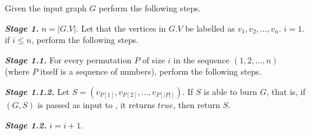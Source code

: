 \begin{algorithm}\label{algorithm:burn-general-optimal}
Given the input graph $G$ perform the following steps.
\end{algorithm}

\textbf{\textit{Stage 1.}} $n = |G.V|$. Let that the vertices in $G.V$ be labelled as $v_1,v_2,\dots,v_n$. $i=1$. if $i\leq n$, perform the following steps.

\textbf{\textit{Stage 1.1.}} For every permutation $P$ of size $i$ in the sequence $(1,2,\dots,n)$ (where $P$ itself is a sequence of numbers), perform the following steps.

\textbf{\textit{Stage 1.1.2.}} Let $S = (v_{P[1]},v_{P[2]},\dots,v_{P[|P|]})$. If $S$ is able to burn $G$, that is, if $(G,S)$ is passed as input to , it returns $true$, then return $S$.

\textbf{\textit{Stage 1.2.}} $i=i+1$.

% 
% 